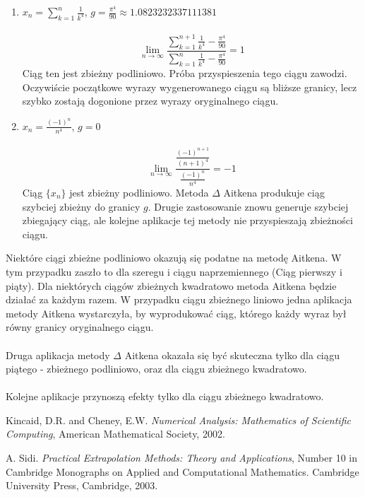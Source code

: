 \documentclass{article}
\begin{document}
\begin{enumerate}
\item $x_n =\sum\limits_{k=1}^n \frac{1}{k^4}$, $g = \frac{\pi^4}{90} \approx 1.0823232337111381$  \\ \\
\begin{equation*}
\lim_{n \to \infty} \frac{\sum\limits_{k=1}^{n+1} \frac{1}{k^4} - \frac{\pi^4}{90}}{\sum\limits_{k=1}^n \frac{1}{k^4} - \frac{\pi^4}{90}} = 1
\end{equation*}
Ciąg ten jest zbieżny podliniowo. Próba przyspieszenia tego ciągu zawodzi. Oczywiście początkowe wyrazy wygenerowanego ciągu są bliższe granicy, lecz szybko zostają dogonione przez wyrazy oryginalnego ciągu.

\item $x_n = \frac{(-1)^n}{n^4}$, $g = 0$ \\ \\
\begin{equation*}
\lim_{n \to \infty} \frac{\frac{(-1)^{n+1}}{(n+1)^4}}{\frac{(-1)^{n}}{n^4}} = -1
\end{equation*}
Ciąg $\{x_n\}$ jest zbieżny podliniowo. Metoda $\Delta$ Aitkena produkuje ciąg szybciej zbieżny do granicy $g$. Drugie zastosowanie znowu generuje szybciej zbiegający ciąg, ale kolejne aplikacje tej metody nie przyspieszają zbieżności ciągu.
\end{enumerate}

Niektóre ciągi zbieżne podliniowo okazują się podatne na metodę Aitkena. W tym przypadku zaszło to dla szeregu i ciągu naprzemiennego (Ciąg pierwszy i piąty). Dla niektórych ciągów zbieżnych kwadratowo metoda Aitkena będzie działać za każdym razem. W przypadku ciągu zbieżnego liniowo jedna aplikacja metody Aitkena wystarczyła, by wyprodukować ciąg, którego każdy wyraz był równy granicy oryginalnego ciągu. 
\\ \\
Druga aplikacja metody $\Delta$ Aitkena okazała się być skuteczna tylko dla ciągu piątego - zbieżnego podliniowo, oraz dla ciągu zbieżnego kwadratowo.
\\ \\
Kolejne aplikacje przynoszą efekty tylko dla ciągu zbieżnego kwadratowo.

\begin{thebibliography}{9} %

Kincaid, D.R. and Cheney, E.W.
\emph{Numerical Analysis: Mathematics of Scientific Computing},
American Mathematical Society, 2002.

A. Sidi.
\emph{Practical Extrapolation Methods: Theory and Applications},
Number 10 in Cambridge Monographs on Applied and Computational Mathematics.
Cambridge University Press, Cambridge, 2003.

\end{thebibliography}
\end{document}
